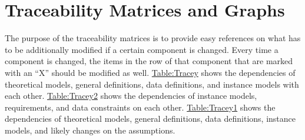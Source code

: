 \documentclass[12pt]{article}
\begin{document}
\section{Traceability Matrices and Graphs}
\label{Sec:TraceMatrices}
The purpose of the traceability matrices is to provide easy references on what has to be additionally modified if a certain component is changed. Every time a component is changed, the items in the row of that component that are marked with an ``X'' should be modified as well. \hyperref[Table:Tracey]{Table:Tracey} shows the dependencies of theoretical models, general definitions, data definitions, and instance models with each other. \hyperref[Table:Tracey2]{Table:Tracey2} shows the dependencies of instance models, requirements, and data constraints on each other. \hyperref[Table:Tracey1]{Table:Tracey1} shows the dependencies of theoretical models, general definitions, data definitions, instance models, and likely changes on the assumptions.
\end{document}

